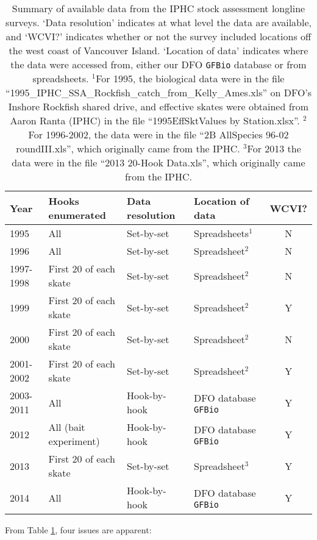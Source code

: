 \begin{table}[t] \centering
\caption{Summary of available data from the IPHC stock assessment longline
surveys. `Data resolution' indicates at what level the data are available, and
`WCVI?' indicates whether or not the survey included locations off the west
coast of Vancouver Island. `Location of data' indicates where the data were
accessed from, either our DFO {\tt GFBio} database or from spreadsheets. $^1$For
1995, the biological data were in the file
``1995\_IPHC\_SSA\_Rockfish\_catch\_from\_Kelly\_Ames.xls'' on DFO's Inshore
Rockfish shared drive, and effective skates were obtained from Aaron Ranta
(IPHC) in the file ``1995EffSktValues by Station.xlsx''. $^2$For 1996-2002, the
data were in the file ``2B AllSpecies 96-02 roundIII.xls'', which originally
came from the IPHC. $^3$For 2013 the data were in the file ``2013 20-Hook
Data.xls'', which originally came from the IPHC.}
\label{tab:IPHCdata}
\begin{tabular}{llllc}
  \hline
Year & Hooks enumerated & Data resolution & Location of data & WCVI?\\
  \hline
1995 & All & Set-by-set & Spreadsheets$^1$ & N\\
1996 & All & Set-by-set & Spreadsheet$^2$ & N\\
1997-1998 & First 20 of each skate & Set-by-set & Spreadsheet$^2$ & N\\
1999 & First 20 of each skate & Set-by-set & Spreadsheet$^2$ & Y\\
2000 & First 20 of each skate & Set-by-set & Spreadsheet$^2$ & N\\
2001-2002 & First 20 of each skate & Set-by-set & Spreadsheet$^2$ & Y\\
2003-2011 & All & Hook-by-hook & DFO database {\tt GFBio} & Y\\
2012 & All (bait experiment)      & Hook-by-hook & DFO database {\tt GFBio} & Y\\
2013 & First 20 of each skate & Set-by-set & Spreadsheet$^3$ & Y\\
2014 & All & Hook-by-hook & DFO database {\tt GFBio} & Y\\
   \hline
\end{tabular}
\end{table}%

From Table \ref{tab:IPHCdata}, four issues are apparent: 

